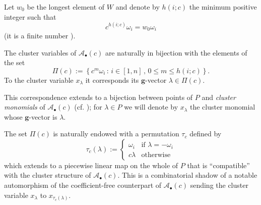 \documentclass[pdftex]{sigma}
\numberwithin{equation}{section}
\numberwithin{theorem}{section}
\numberwithin{proposition}{section}
\numberwithin{lemma}{section}
\numberwithin{corollary}{section}
\numberwithin{definition}{section}
\numberwithin{example}{section}
\numberwithin{remark}{section}
\numberwithin{note}{section}
\newcommand{\cA}{\mathcal{A}}
\newcommand{\bg}{\mathbf{g}}
\begin{document}
  Let $w_0$ be the longest element of $W$ and denote by $h(i;c)$ the minimum positive integer such that
  \[
    c^{h(i;c)}\omega_i = w_0\omega_i
  \]
  (it is a finite number \cite[Proposition 1.3]{YZ08}).
  \begin{theorem}[{\cite[Theorem 1.4]{YZ08}}]
    The cluster variables of $\cA_\bullet(c)$ are naturally in bijection with the elements of the set
    \[
      \Pi(c)
      :=
      \left\{
        c^m\omega_i \, :\, i\in[1,n] \, , \, 0\leq m \leq h(i;c)
      \right\}.
    \]
    To the cluster variable $x_\lambda$ it corresponds its $\bg$-vector $\lambda\in\Pi(c)$.
  \end{theorem}
  This correspondence extends to a bijection between points of $P$ and \emph{cluster monomials} of $\cA_\bullet(c)$ (cf. \cite[Theorem 1.2]{Ste13}); for $\lambda\in P$ we will denote by $x_\lambda$ the cluster monomial whose $\bg$-vector is $\lambda$.

  The set $\Pi(c)$ is naturally endowed with a permutation $\tau_c$ defined by
  \[
    \tau_c (\lambda)
    :=
    \begin{cases}
      \omega_i  & \text{if $\lambda = -\omega_i$} \\
      c\lambda  & \text{otherwise}
    \end{cases}
  \]
  which extends to a piecewise linear map on the whole of $P$ that is ``compatible'' with the cluster structure of $\cA_\bullet(c)$.
  This is a combinatorial shadow of a notable automorphism of the coefficient-free counterpart of $\cA_\bullet(c)$ sending the cluster variable $x_\lambda$ to $x_{\tau_c(\lambda)}$.
\end{document}
